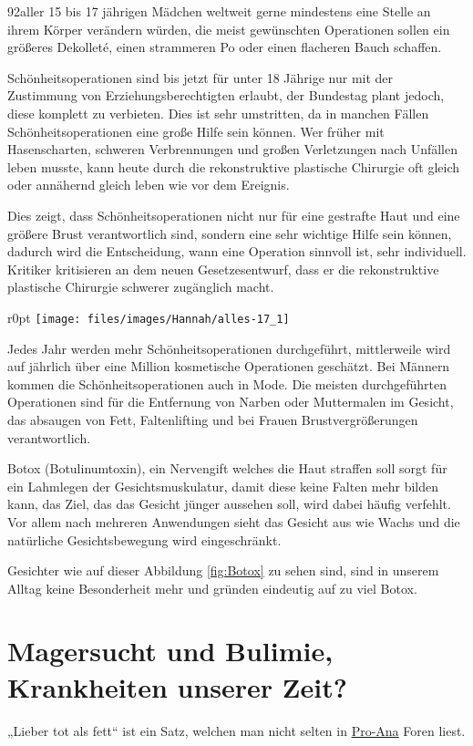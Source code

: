 92\Prozent aller 15 bis 17 jährigen Mädchen weltweit gerne mindestens eine Stelle an ihrem
Körper verändern würden, die meist gewünschten Operationen sollen ein größeres Dekolleté,
einen strammeren Po oder einen flacheren Bauch schaffen.

Schönheitsoperationen sind bis jetzt für unter 18 Jährige nur mit der Zustimmung von
Erziehungsberechtigten erlaubt, der Bundestag plant jedoch, diese komplett zu verbieten. Dies ist
sehr umstritten, da in manchen Fällen Schönheitsoperationen eine große Hilfe sein können. Wer früher
mit Hasenscharten, schweren Verbrennungen und großen Verletzungen nach Unfällen leben musste, kann
heute durch die rekonstruktive plastische Chirurgie oft gleich oder annähernd gleich leben wie vor
dem Ereignis.

Dies zeigt, dass Schönheitsoperationen nicht nur für eine gestrafte Haut und eine größere Brust
verantwortlich sind, sondern eine sehr wichtige Hilfe sein können, dadurch wird die Entscheidung,
wann eine Operation sinnvoll ist, sehr individuell. Kritiker kritisieren an dem neuen
Gesetzesentwurf, dass er die rekonstruktive plastische Chirurgie schwerer zugänglich macht.

\begin{wrapfigure}{r}{0pt}
	\texttt{[image: files/images/Hannah/alles-17\_1]}%
	\label{fig:Botox}
\end{wrapfigure}
Jedes Jahr werden mehr Schönheitsoperationen durchgeführt, mittlerweile wird auf jährlich über eine
Million kosmetische Operationen geschätzt. Bei Männern kommen die Schönheitsoperationen auch in Mode.
Die meisten durchgeführten Operationen sind für die Entfernung von Narben oder Muttermalen im
Gesicht, das absaugen von Fett, Faltenlifting und bei Frauen Brustvergrößerungen verantwortlich.

Botox (Botulinumtoxin), ein Nervengift welches die Haut straffen soll sorgt für ein Lahmlegen der
Gesichtsmuskulatur, damit diese keine Falten mehr bilden kann, das Ziel, das das Gesicht jünger
aussehen soll, wird dabei häufig verfehlt. Vor allem nach mehreren Anwendungen sieht das Gesicht aus
wie Wachs und die natürliche Gesichtsbewegung wird eingeschränkt.

Gesichter wie auf dieser Abbildung \vref{fig:Botox} zu sehen sind, sind in unserem Alltag
keine Besonderheit mehr und gründen eindeutig auf zu viel Botox.

\section{Magersucht und Bulimie, Krankheiten unserer Zeit?}
„Lieber tot als fett“ ist ein Satz, welchen man nicht selten in
\href{http://de.wikipedia.org/wiki/Pro-Ana}{Pro-Ana} Foren liest.

